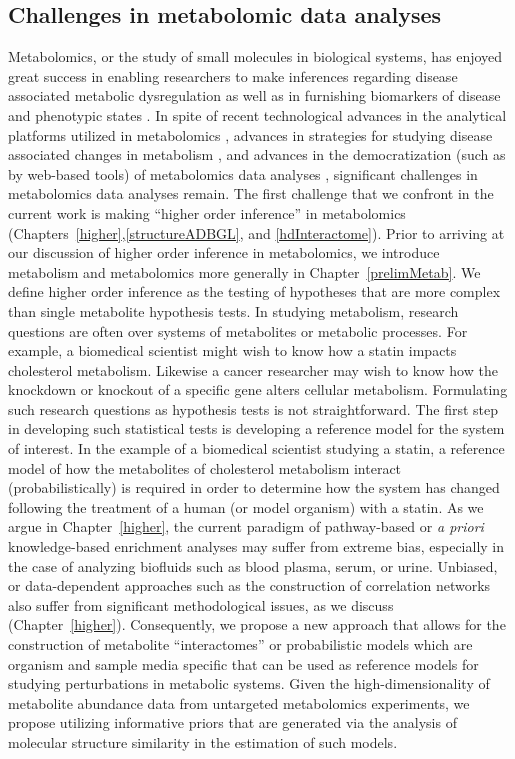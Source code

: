 \begin{DoubleSpace*}
\section{Challenges in metabolomic data analyses}
Metabolomics, or the study of small molecules in biological systems, has enjoyed great success in enabling researchers to make inferences regarding disease associated metabolic dysregulation as well as in furnishing biomarkers of disease and phenotypic states \cite{dunn2013,carlisle2016,johnson2016,newgard2017}. In spite of recent technological advances in the analytical platforms utilized in metabolomics \cite{gowda2014,gowda2016}, advances in strategies for studying disease associated changes in metabolism \cite{bruntz2017,krycer2017}, and advances in the democratization (such as by web-based tools) of metabolomics data analyses \cite{warth2017,guijas2018,chong2018}, significant challenges in metabolomics data analyses remain. The first challenge that we confront in the current work is making ``higher order inference'' in metabolomics (Chapters~\ref{higher},\ref{structureADBGL}, and \ref{hdInteractome}). Prior to arriving at our discussion of higher order inference in metabolomics, we introduce metabolism and metabolomics more generally in Chapter~\ref{prelimMetab}. We define higher order inference as the testing of hypotheses that are more complex than single metabolite hypothesis tests. In studying metabolism, research questions are often over systems of metabolites or metabolic processes. For example, a biomedical scientist might wish to know how a statin impacts cholesterol metabolism. Likewise a cancer researcher may wish to know how the knockdown or knockout of a specific gene alters cellular metabolism. Formulating such research questions as hypothesis tests is not straightforward. The first step in developing such statistical tests is developing a reference model for the system of interest. In the example of a biomedical scientist studying a statin, a reference model of how the metabolites of cholesterol metabolism interact (probabilistically) is required in order to determine how the system has changed following the treatment of a human (or model organism) with a statin. As we argue in Chapter~\ref{higher}, the current paradigm of pathway-based or \emph{a priori} knowledge-based enrichment analyses may suffer from extreme bias, especially in the case of analyzing biofluids such as blood plasma, serum, or urine. Unbiased, or data-dependent approaches such as the construction of correlation networks also suffer from significant methodological issues, as we discuss (Chapter~\ref{higher}). Consequently, we propose a new approach that allows for the construction of metabolite ``interactomes'' or probabilistic models which are organism and sample media specific that can be used as reference models for studying perturbations in metabolic systems. Given the high-dimensionality of metabolite abundance data from untargeted metabolomics experiments, we propose utilizing informative priors that are generated via the analysis of molecular structure similarity in the estimation of such models. 


\end{DoubleSpace*}
